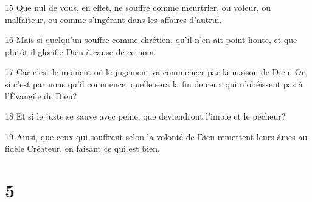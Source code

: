 \par 15 Que nul de vous, en effet, ne souffre comme meurtrier, ou voleur, ou malfaiteur, ou comme s'ingérant dans les affaires d'autrui.
\par 16 Mais si quelqu'un souffre comme chrétien, qu'il n'en ait point honte, et que plutôt il glorifie Dieu à cause de ce nom.
\par 17 Car c'est le moment où le jugement va commencer par la maison de Dieu. Or, si c'est par nous qu'il commence, quelle sera la fin de ceux qui n'obéissent pas à l'Évangile de Dieu?
\par 18 Et si le juste se sauve avec peine, que deviendront l'impie et le pécheur?
\par 19 Ainsi, que ceux qui souffrent selon la volonté de Dieu remettent leurs âmes au fidèle Créateur, en faisant ce qui est bien.

\chapter{5}

